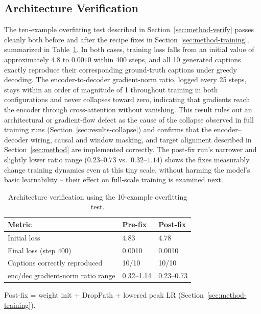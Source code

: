 \documentclass[conference]{IEEEtran}
\begin{document}
\subsection{Architecture Verification}
\label{sec:results-verify}
The ten-example overfitting test described in Section~\ref{sec:method-verify} passes cleanly both before and after the recipe fixes in Section~\ref{sec:method-training}, summarized in Table~\ref{tab:overfit-test}. In both cases, training loss falls from an initial value of approximately 4.8 to $0.0010$ within 400 steps, and all 10 generated captions exactly reproduce their corresponding ground-truth captions under greedy decoding. The encoder-to-decoder gradient-norm ratio, logged every 25 steps, stays within an order of magnitude of 1 throughout training in both configurations and never collapses toward zero, indicating that gradients reach the encoder through cross-attention without vanishing. This result rules out an architectural or gradient-flow defect as the cause of the collapse observed in full training runs (Section~\ref{sec:results-collapse}) and confirms that the encoder--decoder wiring, causal and window masking, and target alignment described in Section~\ref{sec:method} are implemented correctly. The post-fix run's narrower and slightly lower ratio range ($0.23$--$0.73$ vs.\ $0.32$--$1.14$) shows the fixes measurably change training dynamics even at this tiny scale, without harming the model's basic learnability -- their effect on full-scale training is examined next.

\begin{table}[htbp]
\centering
\caption{Architecture verification using the 10-example overfitting test.}
\label{tab:overfit-test}
\small
\renewcommand{\arraystretch}{1.12}
\begin{tabular}{@{}p{}p{}p{}@{}}
\toprule
\textbf{Metric} & \textbf{Pre-fix} & \textbf{Post-fix} \\
\midrule
Initial loss & 4.83 & 4.78 \\
Final loss (step 400) & 0.0010 & 0.0010 \\
Captions correctly reproduced & 10/10 & 10/10 \\
enc/dec gradient-norm ratio range & 0.32--1.14 & 0.23--0.73 \\
\bottomrule
\end{tabular}

\vspace{2pt}
\footnotesize Post-fix = weight init + DropPath + lowered peak LR (Section~\ref{sec:method-training}).
\end{table}
\end{document}
